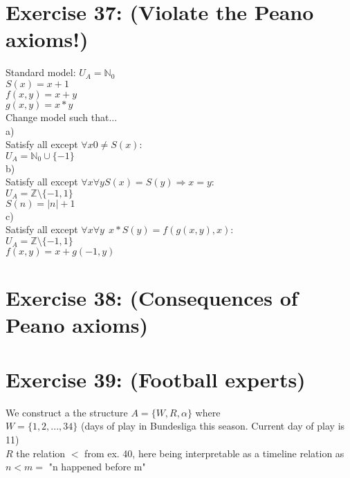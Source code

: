 \documentclass[12pt]{article}
\newcommand{\N}{\mathbb N}
\newcommand{\Z}{\mathbb Z}
\begin{document}
 

\rhead{\today}


\section*{Exercise 37:  (Violate the Peano axioms!)}

Standard model:
$U_A = \N _0$\\
$S(x) = x+1$\\
$f(x,y) = x+y$\\
$g(x,y) = x*y$\\
Change model such that...\\

a)\\
Satisfy all except $\forall x 0 \ne S(x)$:\\
$U_A = \N_0 \cup \{-1\}$\\

b) \\
Satisfy all except $\forall x \forall y S(x) = S(y) \Rightarrow x = y$:\\
$U_A = \Z \setminus \{-1, 1\}$\\
$S(n) = |n| + 1$\\

c)\\ %
Satisfy all except $\forall x \forall y \ \ x*S(y) = f(g(x,y),x)$:\\
$U_A = \Z \setminus \{-1,1\}$\\
$f(x,y) = x + g(-1,y)$

\section*{Exercise 38: (Consequences of Peano axioms)}

\section*{Exercise 39: (Football experts)}

We construct a the structure $A=\{W, R, \alpha \}$ where\\ 
$W = \{1, 2, ... , 34\}$ (days of play in Bundesliga this season. Current day of play is 11)\\
$R$ the relation $<$ from ex. 40, here being interpretable as a timeline relation as $n<m =$ "n happened before m"\\ \\
\end{document}
